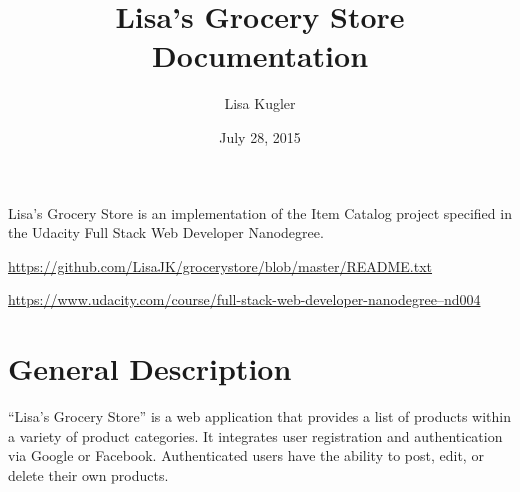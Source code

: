 \documentclass[letterpaper,10pt,english]{sphinxmanual}
\title{Lisa's Grocery Store Documentation}
\date{July 28, 2015}
\author{Lisa Kugler}
\begin{document}
\maketitle
\tableofcontents
{}\label{index::doc}


Lisa's Grocery Store is an implementation of the Item Catalog project specified in the Udacity Full
Stack Web Developer Nanodegree.




\href{https://github.com/LisaJK/grocerystore/blob/master/README.txt}{https://github.com/LisaJK/grocerystore/blob/master/README.txt}






\href{https://www.udacity.com/course/full-stack-web-developer-nanodegree--nd004}{https://www.udacity.com/course/full-stack-web-developer-nanodegree--nd004}




\chapter{General Description}
\label{index:general-description}\label{index:welcome-to-lisa-s-grocery-store-s-documentation}
``Lisa's Grocery Store'' is a web application that provides a list of products
within a variety of product categories.
It integrates user registration and authentication via Google or Facebook.
Authenticated users have the ability to post, edit, or delete their own products.
\end{document}
